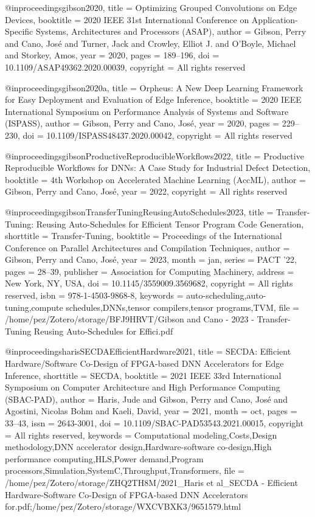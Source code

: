 @inproceedings{gibson2020,
  title = {Optimizing Grouped Convolutions on Edge Devices},
  booktitle = {2020 {{IEEE}} 31st International Conference on Application-Specific Systems, Architectures and Processors ({{ASAP}})},
  author = {Gibson, Perry and Cano, Jos{\'e} and Turner, Jack and Crowley, Elliot J. and O'Boyle, Michael and Storkey, Amos},
  year = {2020},
  pages = {189--196},
  doi = {10.1109/ASAP49362.2020.00039},
  copyright = {All rights reserved}
}

@inproceedings{gibson2020a,
  title = {Orpheus: {{A}} New Deep Learning Framework for Easy Deployment and Evaluation of Edge Inference},
  booktitle = {2020 {{IEEE}} International Symposium on Performance Analysis of Systems and Software ({{ISPASS}})},
  author = {Gibson, Perry and Cano, Jos{\'e}},
  year = {2020},
  pages = {229--230},
  doi = {10.1109/ISPASS48437.2020.00042},
  copyright = {All rights reserved}
}

@inproceedings{gibsonProductiveReproducibleWorkflows2022,
  title = {Productive {{Reproducible Workflows}} for {{DNNs}}: {{A Case Study}} for {{Industrial Defect Detection}}},
  booktitle = {4th {{Workshop}} on {{Accelerated Machine Learning}} ({{AccML}})},
  author = {Gibson, Perry and Cano, Jos{\'e}},
  year = {2022},
  copyright = {All rights reserved}
}

@inproceedings{gibsonTransferTuningReusingAutoSchedules2023,
  title = {Transfer-{{Tuning}}: {{Reusing Auto-Schedules}} for {{Efficient Tensor Program Code Generation}}},
  shorttitle = {Transfer-{{Tuning}}},
  booktitle = {Proceedings of the {{International Conference}} on {{Parallel Architectures}} and {{Compilation Techniques}}},
  author = {Gibson, Perry and Cano, Jos{\'e}},
  year = {2023},
  month = jan,
  series = {{{PACT}} '22},
  pages = {28--39},
  publisher = {{Association for Computing Machinery}},
  address = {{New York, NY, USA}},
  doi = {10.1145/3559009.3569682},
  copyright = {All rights reserved},
  isbn = {978-1-4503-9868-8},
  keywords = {auto-scheduling,auto-tuning,compute schedules,DNNs,tensor compilers,tensor programs,TVM},
  file = {/home/pez/Zotero/storage/BFJ9HRVT/Gibson and Cano - 2023 - Transfer-Tuning Reusing Auto-Schedules for Effici.pdf}
}

@inproceedings{harisSECDAEfficientHardware2021,
  title = {{{SECDA}}: {{Efficient Hardware}}/{{Software Co-Design}} of {{FPGA-based DNN Accelerators}} for {{Edge Inference}}},
  shorttitle = {{{SECDA}}},
  booktitle = {2021 {{IEEE}} 33rd {{International Symposium}} on {{Computer Architecture}} and {{High Performance Computing}} ({{SBAC-PAD}})},
  author = {Haris, Jude and Gibson, Perry and Cano, Jos{\'e} and Agostini, Nicolas Bohm and Kaeli, David},
  year = {2021},
  month = oct,
  pages = {33--43},
  issn = {2643-3001},
  doi = {10.1109/SBAC-PAD53543.2021.00015},
  copyright = {All rights reserved},
  keywords = {Computational modeling,Costs,Design methodology,DNN accelerator design,Hardware-software co-design,High performance computing,HLS,Power demand,Program processors,Simulation,SystemC,Throughput,Transformers},
  file = {/home/pez/Zotero/storage/ZHQ2TH8M/2021_Haris et al_SECDA - Efficient Hardware-Software Co-Design of FPGA-based DNN Accelerators for.pdf;/home/pez/Zotero/storage/WXCVBXK3/9651579.html}
}

